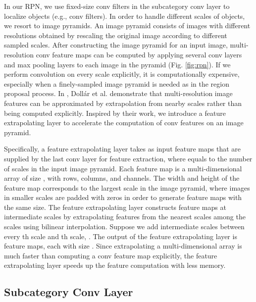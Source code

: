 \documentclass[10pt,twocolumn,letterpaper]{article}
\begin{document}
In our RPN, we use fixed-size conv filters in the subcategory conv layer to localize objects (e.g.,  conv filters). In order to handle different scales of objects, we resort to image pyramids. An image pyramid consists of images with different resolutions obtained by rescaling the original image according to different sampled scales. After constructing the image pyramid for an input image, multi-resolution conv feature maps can be computed by applying several conv layers and max pooling layers to each image in the pyramid (Fig. \ref{fig:rpn}). If we perform convolution on every scale explicitly, it is computationally expensive, especially when a finely-sampled image pyramid is needed as in the region proposal process. In \cite{DollarPAMI14pyramids}, Doll\'{a}r et al. demonstrate that multi-resolution image features can be approximated by extrapolation from nearby scales rather than being computed explicitly. Inspired by their work, we introduce a feature extrapolating layer to accelerate the computation of conv features on an image pyramid.

Specifically, a feature extrapolating layer takes as input  feature maps that are supplied by the last conv layer for feature extraction, where  equals to the number of scales in the input image pyramid. Each feature map is a multi-dimensional array of size , with  rows,  columns, and  channels. The width and height of the feature map corresponds to the largest scale in the image pyramid, where images in smaller scales are padded with zeros in order to generate feature maps with the same size. The feature extrapolating layer constructs feature maps at intermediate scales by extrapolating features from the nearest scales among the  scales using bilinear interpolation. Suppose we add  intermediate scales between every th scale and th scale, . The output of the feature extrapolating layer is  feature maps, each with size . Since extrapolating a multi-dimensional array is much faster than computing a conv feature map explicitly, the feature extrapolating layer speeds up the feature computation with less memory.

\subsection{Subcategory Conv Layer}
\end{document}
